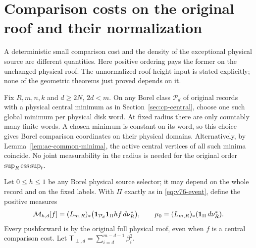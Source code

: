 \section{Comparison costs on the original roof and their normalization}
\label{sec:nc-original-roof}
A deterministic small comparison cost and the density of the
exceptional physical source are different quantities.  Here positive
ordering pays the former on the unchanged physical roof.  The
unnormalized roof-height input is stated explicitly; none of the
geometric theorems just proved depends on it.

Fix $R,m,n,k$ and $d\ge2N$, $2d<m$.  On any Borel class
$\mathcal P_d$ of original records with a physical central minimum
as in Section~\ref{sec:cp-central}, choose one such global minimum
per physical disk word.  At fixed radius there are only countably
many finite words.  A chosen minimum is constant on its word, so
this choice gives Borel comparison coordinates on their physical
domains.  Alternatively, by Lemma~\ref{lem:ae-common-minima}, the
active central vertices of all such minima coincide.  No joint
measurability in the radius is needed for the original order
$\sup_R\operatorname*{ess\,sup}_t$.

Let $0\le h\le1$ be any Borel physical source selector; it may depend
on the whole record and on the fixed labels.  With $\Pi$ exactly as
in \eqref{eq:v76-event}, define the positive measures
\begin{equation}\label{eq:nc-measures}
 \mathcal M_{h,d}[f]
    =(L_{m,R})_*
       \bigl(\mathbf1_{\mathcal P_d}\mathbf1_\Pi h f\,d\nu_R^*\bigr),
 \qquad
 \mu_0=(L_{m,R})_*(\mathbf1_\Pi\,d\nu_R^*).
\end{equation}
Every pushforward is by the original full physical roof, even when
$f$ is a central comparison cost.  Let
$\mathsf T_{\perp,d}=\sum_{i=d}^{m-d-1}\beta_i^2$.

